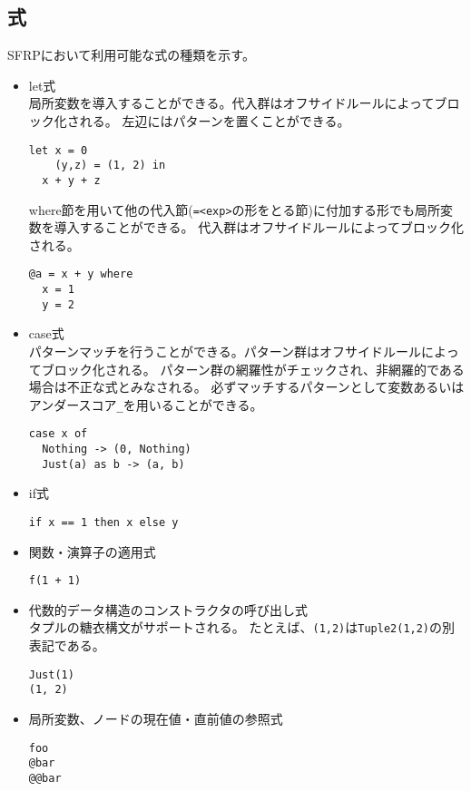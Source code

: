 \subsection{式}
SFRPにおいて利用可能な式の種類を示す。
\begin{itemize}
\item let式\\局所変数を導入することができる。代入群はオフサイドルールによってブロック化される。
左辺にはパターンを置くことができる。
\begin{lstlisting}[basicstyle=\ttfamily\small,language=SFRP]
let x = 0
    (y,z) = (1, 2) in
  x + y + z
\end{lstlisting}
where節を用いて他の代入節(\texttt{=<exp>}の形をとる節)に付加する形でも局所変数を導入することができる。
代入群はオフサイドルールによってブロック化される。
\begin{lstlisting}[basicstyle=\ttfamily\small,language=SFRP]
@a = x + y where
  x = 1
  y = 2
\end{lstlisting}

\item case式\\パターンマッチを行うことができる。パターン群はオフサイドルールによってブロック化される。
パターン群の網羅性がチェックされ、非網羅的である場合は不正な式とみなされる。
必ずマッチするパターンとして変数あるいはアンダースコア\texttt{\_}を用いることができる。
\begin{lstlisting}[basicstyle=\ttfamily\small,language=SFRP]
case x of
  Nothing -> (0, Nothing)
  Just(a) as b -> (a, b)
\end{lstlisting}

\item if式
\begin{lstlisting}[basicstyle=\ttfamily\small,language=SFRP]
if x == 1 then x else y
\end{lstlisting}

\item 関数・演算子の適用式
\begin{lstlisting}[basicstyle=\ttfamily\small,language=SFRP]
f(1 + 1)
\end{lstlisting}

\item 代数的データ構造のコンストラクタの呼び出し式\\
タプルの糖衣構文がサポートされる。
たとえば、\texttt{(1,2)}は\texttt{Tuple2(1,2)}の別表記である。
\begin{lstlisting}[basicstyle=\ttfamily\small,language=SFRP]
Just(1)
(1, 2)
\end{lstlisting}

\item 局所変数、ノードの現在値・直前値の参照式
\begin{lstlisting}[basicstyle=\ttfamily\small,language=SFRP]
foo
@bar
@@bar
\end{lstlisting}
\end{itemize}
